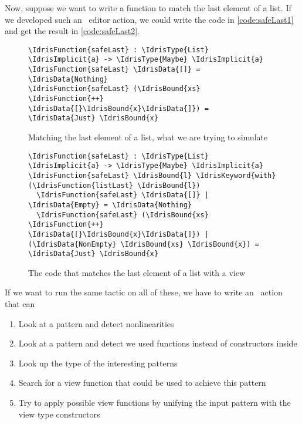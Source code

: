 Now, suppose we want to write a function to match the last element of a list.
If we developed such an \Elab\ editor action, we could write the code in
\autoref{code:safeLast1} and get the result in \autoref{code:safeLast2}.

\begin{figure}[ht]
\caption{Matching the last element of a list, what we are trying to simulate}
\label{code:safeLast1}
\begin{Verbatim}
\IdrisFunction{safeLast} : \IdrisType{List} \IdrisImplicit{a} -> \IdrisType{Maybe} \IdrisImplicit{a}
\IdrisFunction{safeLast} \IdrisData{[]} = \IdrisData{Nothing}
\IdrisFunction{safeLast} (\IdrisBound{xs} \IdrisFunction{++} \IdrisData{[}\IdrisBound{x}\IdrisData{]}) = \IdrisData{Just} \IdrisBound{x}
\end{Verbatim}
\end{figure}

\begin{figure}[ht]
\caption{The code that matches the last element of a list with a view}
\label{code:safeLast2}
\begin{Verbatim}
\IdrisFunction{safeLast} : \IdrisType{List} \IdrisImplicit{a} -> \IdrisType{Maybe} \IdrisImplicit{a}
\IdrisFunction{safeLast} \IdrisBound{l} \IdrisKeyword{with} (\IdrisFunction{listLast} \IdrisBound{l})
  \IdrisFunction{safeLast} \IdrisData{[]} | \IdrisData{Empty} = \IdrisData{Nothing}
  \IdrisFunction{safeLast} (\IdrisBound{xs} \IdrisFunction{++} \IdrisData{[}\IdrisBound{x}\IdrisData{]}) | (\IdrisData{NonEmpty} \IdrisBound{xs} \IdrisBound{x}) = \IdrisData{Just} \IdrisBound{x}
\end{Verbatim}
\end{figure}

If we want to run the same tactic on all of these, we have to write an \Elab\ action
that can
\begin{enumerate}
\item Look at a pattern and detect nonlinearities
\item Look at a pattern and detect we used functions instead of constructors inside
\item Look up the type of the interesting patterns
\item Search for a view function that could be used to achieve this pattern
\item Try to apply possible view functions by unifying the input pattern with the view type constructors
\end{enumerate}
